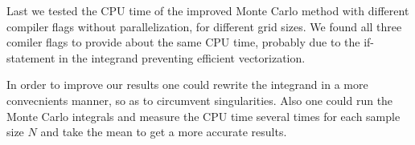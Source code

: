 \documentclass[10pt, twocolumn]{aastex62}
\begin{document}
Last we tested the CPU time of the improved Monte Carlo method with different
compiler flags without parallelization, for different grid sizes. We found
all three comiler flags to provide about the same CPU time, probably due to the
if-statement in the integrand preventing efficient vectorization.

In order to improve our results one could rewrite the integrand in a more
convecnients manner, so as to circumvent singularities. Also one could run the
Monte Carlo integrals and measure the CPU time several times for each sample size
$N$ and take the mean to get a more accurate results.

\nocite{jensen:2019}


\end{document}

